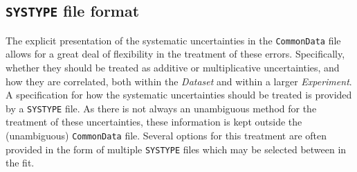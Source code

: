 \documentclass[11pt]{article}
\begin{document}
\subsection{{\tt SYSTYPE} file format}
The explicit presentation of the systematic uncertainties in the {\tt CommonData} file allows for a great deal of flexibility in the treatment of these errors. Specifically, whether they should be treated as additive or multiplicative uncertainties, and how they are correlated, both within the \emph{Dataset} and within a larger \emph{Experiment}. A specification for how the systematic uncertainties should be treated is provided by a {\tt SYSTYPE} file. As there is not always an unambiguous method for the treatment of these uncertainties, these information is kept outside the (unambiguous) {\tt CommonData} file. Several options for this treatment are often provided in the form of multiple {\tt SYSTYPE} files which may be selected between in the fit.
\end{document}
